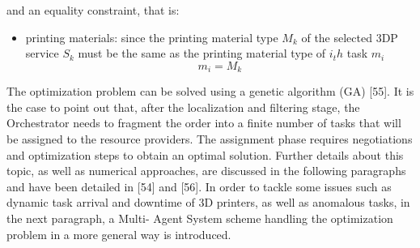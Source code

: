 and an equality constraint, that is:
\begin{itemize}
    \item printing materials: since the printing material type $M_k$ of the selected 3DP service $S_k$ must be the same as the printing material type of $i_th$ task $m_i$ \begin{equation}\label{eq:6}m_i = M_k \end{equation}
\end{itemize}
The optimization problem can be solved using a genetic algorithm (GA) [55]. It is the case to point out that, after the localization and filtering stage, the Orchestrator needs to fragment the order into a finite number of tasks that will be assigned to the resource providers. The assignment phase requires negotiations and optimization steps to obtain an optimal solution. Further details about this topic, as well as numerical approaches, are discussed in
the following paragraphs and have been detailed in [54] and [56].
In order to tackle some issues such as dynamic task arrival and downtime of 3D printers, as well as anomalous tasks, in the next paragraph, a Multi- Agent System scheme handling the optimization problem in a more general way is introduced.
